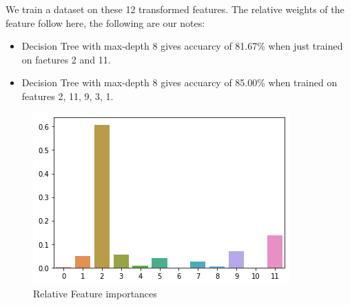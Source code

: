 We train a dataset on these 12 transformed features. The relative weights of the feature follow here, the following are our notes:
\begin{itemize}
    \item Decision Tree with max-depth 8 gives accuarcy of 81.67\% when just trained on faetures 2 and 11.
    \item Decision Tree with max-depth 8 gives accuarcy of 85.00\% when trained on features 2, 11, 9, 3, 1.
\end{itemize}
\begin{figure}[H]
    \centering
    \includegraphics[width=0.8\linewidth]{img/simplify-particle-net/feature-importances.png}
    \caption{Relative Feature importances}
\end{figure}
